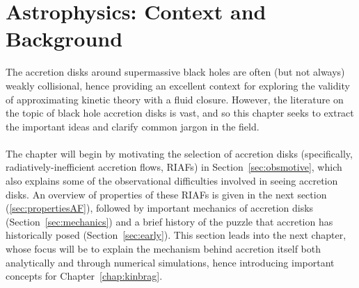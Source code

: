 \chapter{Astrophysics: Context and Background} \label{chap:astrophysics}
The accretion disks around supermassive black holes are often (but not always) weakly collisional, hence providing an excellent context for exploring the validity of approximating kinetic theory with a fluid closure. However, the literature on the topic of black hole accretion disks is vast, and so this chapter seeks to extract the important ideas and clarify common jargon in the field.\\
\\
The chapter will begin by motivating the selection of accretion disks (specifically, radiatively-inefficient accretion flows, RIAFs) in Section~\ref{sec:obsmotive}, which also explains some of the observational difficulties involved in seeing accretion disks. An overview of properties of these RIAFs is given in the next section (\ref{sec:propertiesAF}), followed by important mechanics of accretion disks (Section~\ref{sec:mechanics}) and a brief history of the puzzle that accretion has historically posed (Section~\ref{sec:early}). This section leads into the next chapter, whose focus will be to explain the mechanism behind accretion itself both analytically and through numerical simulations, hence introducing important concepts for Chapter~\ref{chap:kinbrag}.  

